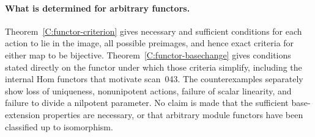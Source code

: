 \paragraph{What is determined for arbitrary functors.}
Theorem~\ref{C:functor-criterion} gives necessary and sufficient conditions for each action to lie in the image, all possible preimages, and hence exact criteria for either map to be bijective. Theorem~\ref{C:functor-basechange} gives conditions stated directly on the functor under which those criteria simplify, including the internal Hom functors that motivate scan~043. The counterexamples separately show loss of uniqueness, nonunipotent actions, failure of scalar linearity, and failure to divide a nilpotent parameter. No claim is made that the sufficient base-extension properties are necessary, or that arbitrary module functors have been classified up to isomorphism.

